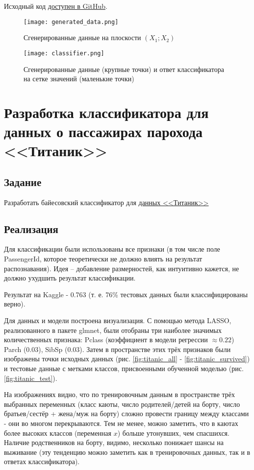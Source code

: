 \documentclass[a4paper,12pt]{article} %
\newcommand{\myPictWidth}{.95\textwidth}
\begin{document}
Исходный код \href{https://github.com/zuevval/source/blob/master/r/ml/lab1bayes/task2_artificial_data.R}{доступен в GitHub}.

\begin{figure}[H]
	\centering \texttt{[image: generated\_data.png]}
	\caption{Сгенерированные данные на плоскости $(X_1;X_2)$}
	\label{fig:art_data}
\end{figure}

\begin{figure}[H]
	\centering \texttt{[image: classifier.png]}
	\caption{Сгенерированные данные (крупные точки) и ответ классификатора на сетке значений (маленькие точки)}
	\label{fig:art_classifier}
\end{figure}


\section{Разработка классификатора для данных о пассажирах парохода <<Титаник>>}
\subsection{Задание}
Разработать байесовский классификатор для \href{https://www.kaggle.com/c/titanic}{данных <<Титаник>>}

\subsection{Реализация}

Для классификации были использованы все признаки (в том числе поле Pas\-sen\-ger\-Id, которое теоретически не должно влиять на результат распознавания). Идея -- добавление размерностей, как интуитивно кажется, не должно ухудшить результат классификации.

Результат на Kaggle - 0.763 (т. е. 76\% тестовых данных были классифицированы верно).


Для данных и модели построена визуализация. С помощью метода LASSO, реализованного в пакете glmnet, были отобраны три наиболее значимых количественных признака: Pclass (коэффициент в модели регрессии $\approx 0.22$) Parch ($0.03$), SibSp ($0.03$). Затем в пространстве этих трёх признаков были изображены точки исходных данных (рис. \ref{fig:titanic_all} - \ref{fig:titanic_survived}) и тестовые данные с метками классов, присвоенными обученной моделью (рис. \ref{fig:titanic_test}).

На изображениях видно, что по тренировочным данным в пространстве трёх выбранных переменных (класс каюты, число родителей/детей на борту, число братьев/сестёр + жена/муж на борту) сложно провести границу между классами - они во многом перекрываются. Тем не менее, можно заметить, что в каютах более высоких классов (переменная $x$) больше утонувших, чем спасшихся. Наличие родственников на борту, видимо, несколько понижает шансы на выживание (эту тенденцию можно заметить как в тренировочных данных, так и в ответах классификатора).
\end{document}
